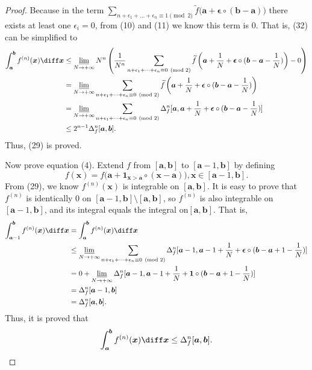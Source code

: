 \documentclass{ijclclp}
\begin{document}
\begin{proof}
    Because in the term \(\sum\limits_{n+\epsilon_1+\dots+\epsilon_n\equiv1\pmod2}\widetilde{f}\big(\boldsymbol{a}+\boldsymbol{\epsilon}\circ(\boldsymbol{b}-\boldsymbol{a})\big)\) there exists at least one \(\epsilon_i=0\), from  (10) and (11) we know this term is 0. That is, (32) can be simplified to
    \begin{align*}
        \int_{\boldsymbol{a}}^{\boldsymbol{b}}f^{(n)}(\boldsymbol{x})\diff \boldsymbol{x}&\leq\varliminf_{N\to+\infty}N^n\left(\frac{1}{N^n}\sum_{n+\epsilon_1+\dots+\epsilon_n\equiv0\pmod2}\widetilde{f}\left(\boldsymbol{a}+\frac{1}{N}+\boldsymbol{\epsilon}\circ(\boldsymbol{b}-\boldsymbol{a}-\frac{1}{N})\right)-0\right)\\
        &=\varliminf_{N\to+\infty}\sum_{n+\epsilon_1+\dots+\epsilon_n\equiv0\pmod2}\widetilde{f}\left(\boldsymbol{a}+\frac{1}{N}+\boldsymbol{\epsilon}\circ(\boldsymbol{b}-\boldsymbol{a}-\frac{1}{N})\right)\\
        &=\varliminf_{N\to+\infty}\sum_{n+\epsilon_1+\dots+\epsilon_n\equiv0\pmod2}\Delta_f^n[\boldsymbol{a},\boldsymbol{a}+\frac{1}{N}+\boldsymbol{\epsilon}\circ(\boldsymbol{b}-\boldsymbol{a}-\frac{1}{N})]\\
        &\leq 2^{n-1}\Delta_f^n[\boldsymbol{a},\boldsymbol{b}].
    \end{align*}
    Thus, (29) is proved.
   
    Now prove equation (4). Extend \(f\) from \([\boldsymbol{a},\boldsymbol{b}]\) to \([\boldsymbol{a}-1,\boldsymbol{b}]\) by defining
    \[f(\boldsymbol{x})=f\big(\boldsymbol{a}+\boldsymbol{1}_{\boldsymbol{}\boldsymbol{x}>\boldsymbol{a}}\circ(\boldsymbol{x}-\boldsymbol{a})\big),\boldsymbol{x}\in[\boldsymbol{a}-1,\boldsymbol{b}].\]
    From (29), we know \(f^{(n)}(\boldsymbol{x})\) is integrable on \([\boldsymbol{a},\boldsymbol{b}]\). It is easy to prove that \(f^{(n)}\) is identically 0 on \([\boldsymbol{a}-1,\boldsymbol{b}]\setminus [\boldsymbol{a},\boldsymbol{b}]\), so \(f^{(n)}\) is also integrable on \([\boldsymbol{a}-1,\boldsymbol{b}]\), and its integral equals the integral on\([\boldsymbol{a},\boldsymbol{b}]\). That is,
    \begin{align*}
        \int_{\boldsymbol{a}-1}^{\boldsymbol{b}}f^{(n)}(\boldsymbol{x})\diff \boldsymbol{x}&=\int_{\boldsymbol{a}}^{\boldsymbol{b}}f^{(n)}(\boldsymbol{x})\diff \boldsymbol{x}\\
        &\leq \varliminf_{N\to+\infty}\sum_{n+\epsilon_1+\dots+\epsilon_n\equiv0\pmod2}\Delta_f^n[\boldsymbol{a}-1,\boldsymbol{a}-1+\frac{1}{N}+\boldsymbol{\epsilon}\circ(\boldsymbol{b}-\boldsymbol{a}+1-\frac{1}{N})]\\
        &=0+\varliminf_{N\to+\infty}\Delta_f^n[\boldsymbol{a}-1,\boldsymbol{a}-1+\frac{1}{N}+\boldsymbol{1}\circ(\boldsymbol{b}-\boldsymbol{a}+1-\frac{1}{N})]\\
        &=\Delta_f^n[\boldsymbol{a}-1,\boldsymbol{b}]\\
        &=\Delta_f^n[\boldsymbol{a},\boldsymbol{b}].
    \end{align*}
    Thus, it is proved that
    \[\int_{\boldsymbol{a}}^{\boldsymbol{b}}f^{(n)}(\boldsymbol{x})\diff \boldsymbol{x}\leq \Delta_f^n[\boldsymbol{a},\boldsymbol{b}].\]
\end{proof}
\end{document}
